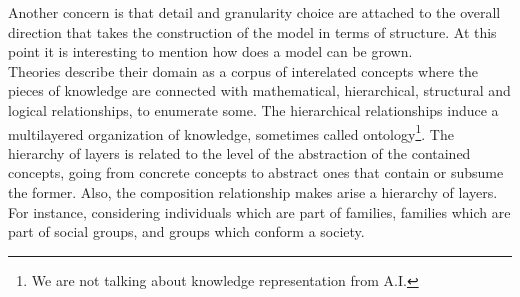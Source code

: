 \documentclass[11pt,oneside,a4paper,openright]{report}
\begin{document}
Another concern is that detail and granularity choice are attached to the overall direction that takes the construction of the model in terms of structure. At this point it is interesting to mention how does a model can be grown.\\
Theories describe their domain as a corpus of interelated concepts where the pieces of knowledge are connected with mathematical, hierarchical, structural and logical relationships, to enumerate some. The hierarchical relationships induce a multilayered organization of knowledge, sometimes called ontology\footnote{We are not talking about knowledge representation from A.I.}. The hierarchy of layers is related to the level of the abstraction of the contained concepts, going from concrete concepts to abstract ones that contain or subsume the former. Also, the composition relationship makes arise a hierarchy of layers. For instance, considering individuals which are part of families, families which are part of social groups, and groups which conform a society. 






%
\end{document}
